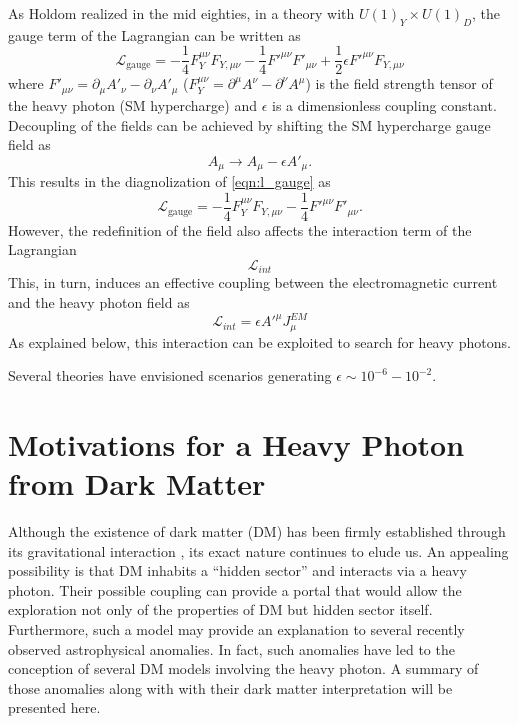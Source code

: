 As Holdom \cite{holdom1986} realized in the mid eighties, in a theory with 
$U(1)_Y \times U(1)_D$, the gauge term of the Lagrangian can be written as 
\begin{equation}
    \mathcal{L}_{\text{gauge}} = - \frac{1}{4} F_Y^{\mu \nu}F_{Y, \mu \nu}
                          - \frac{1}{4} F'^{\mu \nu}F'_{\mu \nu}
                          + \frac{1}{2} \epsilon F'^{\mu \nu} F_{Y, \mu \nu}
    \label{eqn:l_gauge}
\end{equation}
where $F'_{\mu \nu} = \partial_{\mu}A'_{\nu} - \partial_{\nu}A'_{\mu}$ 
($F^{\mu \nu}_{Y} = \partial^{\mu}A^{\nu} - \partial^{\nu}A^{\mu}$) is the
field strength tensor of the heavy photon (SM hypercharge) and $\epsilon$ is a
dimensionless coupling constant.  Decoupling of the fields can be achieved by 
shifting the SM hypercharge gauge field as 
\begin{equation}
    A_{\mu} \rightarrow A_{\mu} - \epsilon A'_{\mu}.
\end{equation}
This results in the diagnolization of \ref{eqn:l_gauge} as
\begin{equation}
    \mathcal{L}_{\text{gauge}} = - \frac{1}{4} F_Y^{\mu \nu}F_{Y, \mu \nu}
                          - \frac{1}{4} F'^{\mu \nu}F'_{\mu \nu}.
\end{equation}
However, the redefinition of the field also affects the interaction term of 
the Lagrangian
\begin{equation}
    \mathcal{L}_{int} 
\end{equation}
This, in turn, induces an effective coupling between the electromagnetic current
and the heavy photon field as 
\begin{equation}
    \mathcal{L}_{int} = \epsilon A'^{\mu}J_{\mu}^{EM}
\end{equation}
As explained below, this interaction can be exploited to search for heavy 
photons.

Several theories have envisioned scenarios generating 
$\epsilon \sim 10^{-6} - 10^{-2}$.

\section{Motivations for a Heavy Photon from Dark Matter}

Although the existence of dark matter (DM) has been firmly established through its
gravitational interaction \cite{popolo2014}, its exact nature continues to elude
us.  An appealing
possibility is that DM inhabits a ``hidden sector'' and interacts via a heavy
photon.  Their possible coupling can provide a portal that would allow the
exploration not only of the properties of DM but hidden sector itself.  Furthermore, such a
model may provide an explanation to several recently observed astrophysical
anomalies.  In fact, such anomalies have led to the conception of several DM
models involving the heavy photon.  A summary of those anomalies along with 
with their dark matter interpretation will be presented here.

